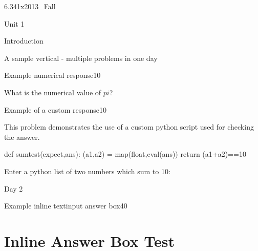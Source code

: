 \documentclass[12pt]{article}
\begin{document}
\begin{edXcourse}{6.341x}{2013_Fall}
\begin{edXchapter}{Unit 1}
\begin{edXsection}{Introduction}

\begin{edXvertical}{A sample vertical - multiple problems in one day}


\begin{edXproblem}{Example numerical response}{10}

What is the numerical value of $pi$?


\end{edXproblem}


\begin{edXproblem}{Example of a custom response}{10}

This problem demonstrates the use of a custom python script used for
checking the answer.

\begin{edXscript}
def sumtest(expect,ans):
    (a1,a2) = map(float,eval(ans))
    return (a1+a2)==10
\end{edXscript}

Enter a python list of two numbers which sum to 10:


\end{edXproblem}


\end{edXvertical}

\end{edXsection} %

\begin{edXsection}{Day 2}


\begin{edXproblem}{Example inline textinput answer box}{40}

\section{Inline Answer Box Test}  


\end{edXproblem}
\end{edXsection}
\end{edXchapter}
\end{edXcourse}
\end{document}
